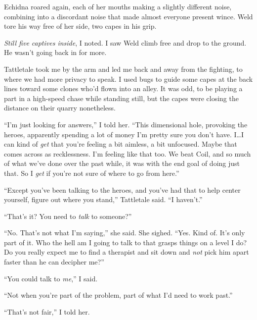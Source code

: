 Echidna roared again, each of her mouths making a slightly different noise, combining into a discordant noise that made almost everyone present wince.  Weld tore his way free of her side, two capes in his grip.



\emph{Still five captives inside}, I noted.  I saw Weld climb free and drop to the ground.  He wasn't going back in for more.



Tattletale took me by the arm and led me back and away from the fighting, to where we had more privacy to speak.  I used bugs to guide some capes at the back lines toward some clones who'd flown into an alley.  It was odd, to be playing a part in a high-speed chase while standing still, but the capes were closing the distance on their quarry nonetheless.



``I'm just looking for answers,'' I told her.  ``This dimensional hole, provoking the heroes, apparently spending a lot of money I'm pretty sure you don't have.  I\ldots I can kind of \emph{get} that you're feeling a bit aimless, a bit unfocused.  Maybe that comes across as recklessness.  I'm feeling like that too.  We beat Coil, and so much of what we've done over the past while, it was with the end goal of doing just that.  So I \emph{get} if you're not sure of where to go from here.''



``Except you've been talking to the heroes, and you've had that to help center yourself, figure out where you stand,'' Tattletale said.  ``I haven't.''



``That's it?  You need to \emph{talk} to someone?''



``No.  That's not what I'm saying,'' she said.  She sighed.  ``Yes.  Kind of.  It's only part of it.  Who the hell am I going to talk to that grasps things on a level I do?  Do you really expect me to find a therapist and sit down and \emph{not} pick him apart faster than he can decipher me?''



``You could talk to \emph{me},'' I said.



``Not when you're part of the problem, part of what I'd need to work past.''



``That's not fair,'' I told her.



